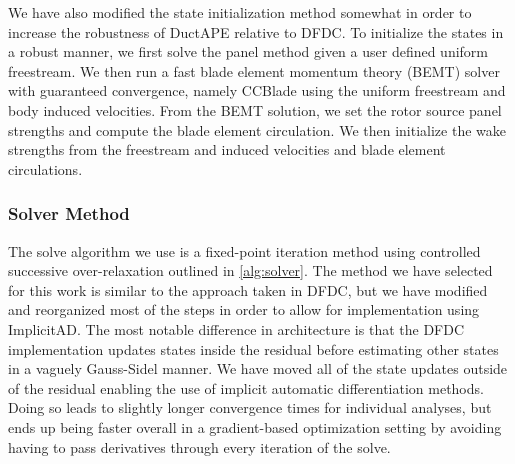 We have also modified the state initialization method somewhat in order to increase the robustness of DuctAPE relative to DFDC.
%
To initialize the states in a robust manner, we first solve the panel method given a user defined uniform freestream.
%
We then run a fast blade element momentum theory (BEMT) solver with guaranteed convergence, namely CCBlade  using the uniform freestream and body induced velocities.
%
From the BEMT solution, we set the rotor source panel strengths and compute the blade element circulation.
%
We then initialize the wake strengths from the freestream and induced velocities and blade element circulations.


\subsubsection{Solver Method}
\label{sssec:ductape_solve}

The solve algorithm we use is a fixed-point iteration method using controlled successive over-relaxation outlined in \cref{alg:solver}.
%
The method we have selected for this work is similar to the approach taken in DFDC, but we have modified and reorganized most of the steps in order to allow for implementation using ImplicitAD.
%
The most notable difference in architecture is that the DFDC implementation updates states inside the residual before estimating other states in a vaguely Gauss-Sidel manner.
%
We have moved all of the state updates outside of the residual enabling the use of implicit automatic differentiation methods.
%
Doing so leads to slightly longer convergence times for individual analyses, but ends up being faster overall in a gradient-based optimization setting by avoiding having to pass derivatives through every iteration of the solve.
%



